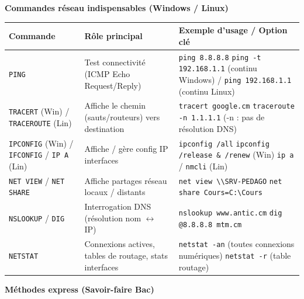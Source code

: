 \documentclass[11pt]{article}
\begin{document}
\begin{aretenir}
\textbf{Commandes réseau indispensables (Windows / Linux)}
\begin{center}
\begin{tabularx}{\linewidth}{|l|X|X|}
\hline
\rowcolor{popblueL}
\textbf{Commande} & \textbf{Rôle principal} & \textbf{Exemple d'usage / Option clé} \\
\hline
\texttt{PING} & Test connectivité (ICMP Echo Request/Reply) & \texttt{ping 8.8.8.8} \quad \texttt{ping -t 192.168.1.1} (continu Windows) / \texttt{ping 192.168.1.1} (continu Linux) \\
\hline
\texttt{TRACERT} (Win) / \texttt{TRACEROUTE} (Lin) & Affiche le chemin (sauts/routeurs) vers destination & \texttt{tracert google.cm} \quad \texttt{traceroute -n 1.1.1.1} (-n : pas de résolution DNS) \\
\hline
\texttt{IPCONFIG} (Win) / \texttt{IFCONFIG} / \texttt{IP A} (Lin) & Affiche / gère config IP interfaces & \texttt{ipconfig /all} \quad \texttt{ipconfig /release \& /renew} (Win) \quad \texttt{ip a} / \texttt{nmcli} (Lin) \\
\hline
\texttt{NET VIEW} / \texttt{NET SHARE} & Affiche partages réseau locaux / distants & \texttt{net view \textbackslash\textbackslash SRV-PEDAGO} \quad \texttt{net share Cours=C:\textbackslash Cours} \\
\hline
\texttt{NSLOOKUP} / \texttt{DIG} & Interrogation DNS (résolution nom $\leftrightarrow$ IP) & \texttt{nslookup www.antic.cm} \quad \texttt{dig @8.8.8.8 mtm.cm} \\
\hline
\texttt{NETSTAT} & Connexions actives, tables de routage, stats interfaces & \texttt{netstat -an} (toutes connexions numériques) \quad \texttt{netstat -r} (table routage) \\
\hline
\end{tabularx}
\end{center}

\textbf{Méthodes express (Savoir-faire Bac)}


\end{aretenir}
\end{document}
